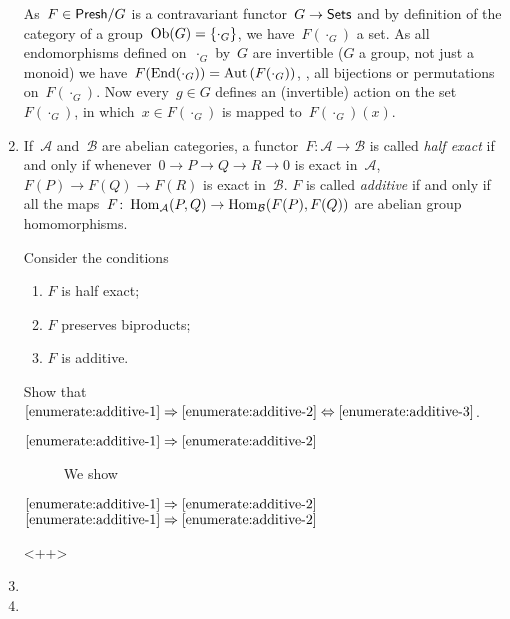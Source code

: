\documentclass[a4paper,11pt,oneside,openany,article]{memoir}
\begin{document}
\begin{enumerate}
    \begin{solution}
      As~$F\in\mathsf{Presh}/G$ is a contravariant functor~$G\to\mathsf{Sets}$ and by definition of the category of a group~$\operatorname{Ob}(G)=\left\{ \cdot_G \right\}$, we have~$F(\cdot_G)$ a set. As all endomorphisms defined on~$\cdot_G$ by~$G$ are invertible ($G$ a group, not just a monoid) we have~$F(\operatorname{End}(\cdot_G))=\operatorname{Aut}\left( F(\cdot_G) \right)$, \ie, all bijections or permutations on~$F(\cdot_G)$. Now every~$g\in G$ defines an (invertible) action on the set~$F(\cdot_G)$, in which~$x\in F(\cdot_G)$ is mapped to~$F(\cdot_G)(x)$.
    \end{solution}

  \item If~$\mathcal{A}$ and~$\mathcal{B}$ are abelian categories, a functor~$F\colon\mathcal{A}\to\mathcal{B}$ is called \emph{half exact} if and only if whenever~$0\to P\to Q\to R\to 0$ is exact in~$\mathcal{A}$, $F(P)\to F(Q)\to F(R)$ is exact in~$\mathcal{B}$. $F$ is called \emph{additive} if and only if all the maps~$F\colon\operatorname{Hom}_{\mathcal{A}}(P,Q)\to\operatorname{Hom}_{\mathcal{B}}(F(P),F(Q))$ are abelian group homomorphisms.

    Consider the conditions
    \begin{enumerate}
      \item\label{enumerate:additive-1} $F$ is half exact;
      \item\label{enumerate:additive-2} $F$ preserves biproducts;
      \item\label{enumerate:additive-3} $F$ is additive.
    \end{enumerate}
    Show that~$\ref{enumerate:additive-1}\Rightarrow\ref{enumerate:additive-2}\Leftrightarrow\ref{enumerate:additive-3}$.

    \begin{solution}
      \begin{description}
        \item[$\ref{enumerate:additive-1}\Rightarrow\ref{enumerate:additive-2}$] We show
        \item[$\ref{enumerate:additive-1}\Rightarrow\ref{enumerate:additive-2}$]
        \item[$\ref{enumerate:additive-1}\Rightarrow\ref{enumerate:additive-2}$]
      \end{description}
    \end{solution}<++>

  \item 

  \item 


\end{enumerate}
\end{document}
